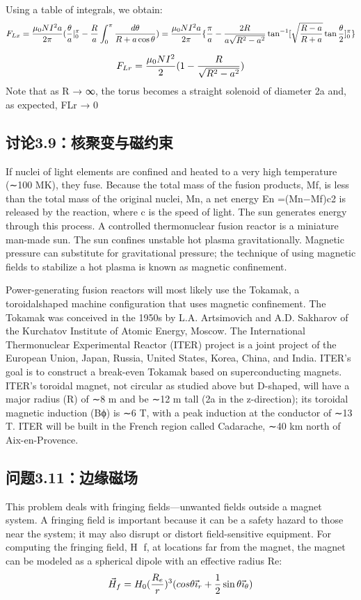 Using a table of integrals, we obtain:
$$
F_{Lx}=\frac{\mu_{0}NI^{2}a}{2\pi}(\frac{\theta}{a}|_{0}^{\pi}-\frac{R}{a}\int_{0}^{\pi}\frac{d\theta}{R+a\cos\theta})\\
=\frac{\mu_{0}NI^{2}a}{2\pi}\{\frac{\pi}{a}-\frac{2R}{a\sqrt{R^{2}-a^{2}}}\tan^{-1}[\sqrt{\frac{R-a}{R+a}}\tan\frac{\theta}{2}]_{0}^{\pi}\}\\%
$$

$$
F_{Lr}=\frac{\mu_{0}NI^{2}}{2}(1-\frac{R}{\sqrt{R^{2}-a^{2}}})\\%
$$
Note that as R → ∞, the torus becomes a straight solenoid of diameter 2a and,
as expected, FLr → 0
\newpage


\subsection{讨论3.9：核聚变与磁约束}
If nuclei of light elements are confined and heated to a very high temperature
(∼100 MK), they fuse. Because the total mass of the fusion products, Mf, is less
than the total mass of the original nuclei, Mn, a net energy En =(Mn−Mf)c2 is
released by the reaction, where c is the speed of light. The sun generates energy
through this process. A controlled thermonuclear fusion reactor is a miniature
man-made sun. The sun confines unstable hot plasma gravitationally. Magnetic
pressure can substitute for gravitational pressure; the technique of using magnetic
fields to stabilize a hot plasma is known as magnetic confinement.


Power-generating fusion reactors will most likely use the Tokamak, a toroidalshaped machine configuration that uses magnetic confinement. The Tokamak was
conceived in the 1950s by L.A. Artsimovich and A.D. Sakharov of the Kurchatov
Institute of Atomic Energy, Moscow. The International Thermonuclear Experimental Reactor (ITER) project is a joint project of the European Union, Japan,
Russia, United States, Korea, China, and India. ITER’s goal is to construct a
break-even Tokamak based on superconducting magnets. ITER’s toroidal magnet, not circular as studied above but D-shaped, will have a major radius (R) of
∼8 m and be ∼12 m tall (2a in the z-direction); its toroidal magnetic induction
(Bϕ) is ∼6 T, with a peak induction at the conductor of ∼13 T. ITER will be built
in the French region called Cadarache, ∼40 km north of Aix-en-Provence.

\newpage
\subsection{问题3.11：边缘磁场}
This problem deals with fringing fields—unwanted fields outside a magnet system.
A fringing field is important because it can be a safety hazard to those near the
system; it may also disrupt or distort field-sensitive equipment. For computing the
fringing field, H f, at locations far from the magnet, the magnet can be modeled
as a spherical dipole with an effective radius Re:
$$
\vec{H}_{f}=H_{0}(\frac{R_{e}}{r})^{3}(cos\theta\vec{\imath}_{r}+\frac{1}{2}\sin\theta\vec{\imath}_{\theta})\\%
$$

